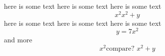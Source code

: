 here is some text here is some text here is some text
\[
x^2 \text{$x^2+y$}
\]
here is some text here is some text here is some text \[ y=7x^2\] and more
\[
x^2 \text{compare? $x^2+y$}
\]
